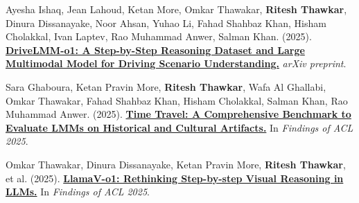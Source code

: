 \documentclass[11pt,a4paper]{article}
\begin{document}
\begin{description}
  \par{}
  \item[\textbf{[S6]}]
    Ayesha Ishaq, Jean Lahoud, Ketan More, Omkar Thawakar, \textbf{Ritesh Thawkar}, Dinura Dissanayake, Noor Ahsan, Yuhao Li, Fahad Shahbaz Khan, Hisham Cholakkal, Ivan Laptev, Rao Muhammad Anwer, Salman Khan. (2025). \href{https://arxiv.org/abs/2503.10621}{\textbf{DriveLMM-o1: A Step-by-Step Reasoning Dataset and Large Multimodal Model for Driving Scenario Understanding.}} \textit{arXiv preprint}.
  \par{}
  \item[\textbf{[C7]}]
    Sara Ghaboura, Ketan Pravin More, \textbf{Ritesh Thawkar}, Wafa Al Ghallabi, Omkar Thawakar, Fahad Shahbaz Khan, Hisham Cholakkal, Salman Khan, Rao Muhammad Anwer. (2025). \href{https://aclanthology.org/2025.findings-acl.1211/}{\textbf{Time Travel: A Comprehensive Benchmark to Evaluate LMMs on Historical and Cultural Artifacts.}} In \textit{Findings of ACL 2025}.
  \par{}
  \item[\textbf{[C8]}]
    Omkar Thawakar, Dinura Dissanayake, Ketan Pravin More, \textbf{Ritesh Thawkar}, et al. (2025). \href{https://aclanthology.org/2025.findings-acl.1247/}{\textbf{LlamaV-o1: Rethinking Step-by-step Visual Reasoning in LLMs.}} In \textit{Findings of ACL 2025}.
\end{description}

\end{document}
